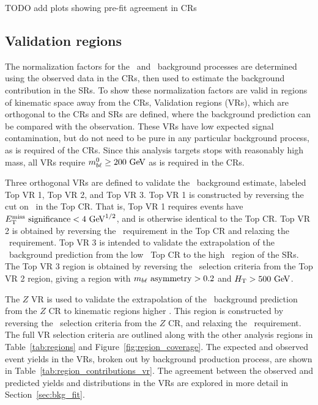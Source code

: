 {\color{red} TODO add plots showing pre-fit agreement in CRs}

\subsection{Validation regions}
\label{sec:vr}

The normalization factors for the \TTBAR\ and \ZGAMMAJETS\ background processes
are determined using the observed data in the CRs, then used to estimate the
background contribution in the SRs.
To show these normalization factors are valid in regions of kinematic space away
from the CRs, Validation regions (VRs), which are orthogonal to the CRs and SRs
are defined, where the background prediction can be compared with the
observation.
These VRs have low expected signal contamination, but do not need to be pure in
any particular background process, as is required of the CRs.
Since this analysis targets stops with reasonably high mass, all VRs require
$\MBL^0 \geq 200 \GeV$ as is required in the CRs.

Three orthogonal VRs are defined to validate the \TTBAR\ background estimate,
labeled Top VR 1, Top VR 2, and Top VR 3.
Top VR 1 is constructed by reversing the cut on \METSIG\ in the Top CR.
That is, Top VR 1 requires events have $\METSIG < 4 \GeV^{1/2}$, and is
otherwise identical to the Top CR.
Top VR 2 is obtained by reversing the \MBLASYM\ requirement in the Top CR and
relaxing the \METSIG\ requirement.
Top VR 3 is intended to validate the extrapolation of the \TTBAR\ background
prediction from the low \HT\ Top CR to the high \HT\ region of the SRs.
The Top VR 3 region is obtained by reversing the \HT\ selection criteria from
the Top VR 2 region, giving a region with $m_{b\ell}~\mathrm{asymmetry} > 0.2$ and $\HT > 500 \GeV$.

The $Z$ VR is used to validate the extrapolation of the \ZGAMMAJETS\ background
prediction from the $Z$ CR to kinematic regions higher \HT.
This region is constructed by reversing the \HT\ selection criteria from the
$Z$ CR, and relaxing the \METSIG\ requirement.
The full VR selection criteria are outlined along with the other analysis
regions in Table~\ref{tab:regions} and Figure~\ref{fig:region_coverage}.
The expected and observed event yields in the VRs, broken out by background
production process, are shown in Table~\ref{tab:region_contributions_vr}.
The agreement between the observed and predicted yields and distributions in the
VRs are explored in more detail in Section~\ref{sec:bkg_fit}.

